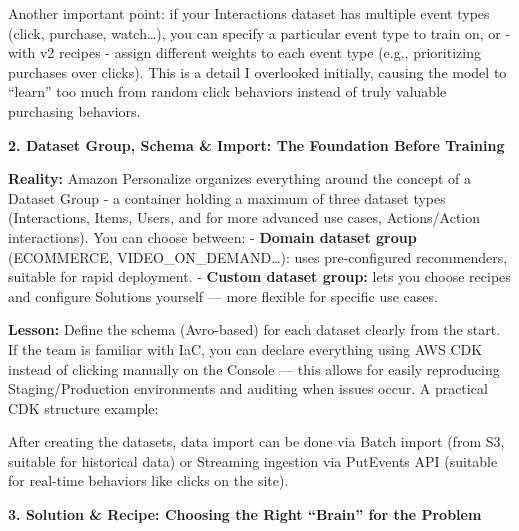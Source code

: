 Another important point: if your Interactions dataset has multiple event
types (click, purchase, watch\ldots), you can specify a particular event
type to train on, or - with v2 recipes - assign different weights to
each event type (e.g., prioritizing purchases over clicks). This is a
detail I overlooked initially, causing the model to ``learn'' too much
from random click behaviors instead of truly valuable purchasing
behaviors.

\vspace{0.5em}\noindent\textbf{2. Dataset Group, Schema \& Import: The Foundation Before
Training}\par

\textbf{Reality:} Amazon Personalize organizes everything around the
concept of a Dataset Group - a container holding a maximum of three
dataset types (Interactions, Items, Users, and for more advanced use
cases, Actions/Action interactions). You can choose between: -
\textbf{Domain dataset group} (ECOMMERCE, VIDEO\_ON\_DEMAND\ldots): uses
pre-configured recommenders, suitable for rapid deployment. -
\textbf{Custom dataset group:} lets you choose recipes and configure
Solutions yourself --- more flexible for specific use cases.

\textbf{Lesson:} Define the schema (Avro-based) for each dataset clearly
from the start. If the team is familiar with IaC, you can declare
everything using AWS CDK instead of clicking manually on the Console ---
this allows for easily reproducing Staging/Production environments and
auditing when issues occur. A practical CDK structure example:

\begin{Shaded}
\begin{Highlighting}[]
\end{Highlighting}
\end{Shaded}

After creating the datasets, data import can be done via Batch import
(from S3, suitable for historical data) or Streaming ingestion via
PutEvents API (suitable for real-time behaviors like clicks on the
site).

\vspace{0.5em}\noindent\textbf{3. Solution \& Recipe: Choosing the Right ``Brain'' for the
Problem}\par

